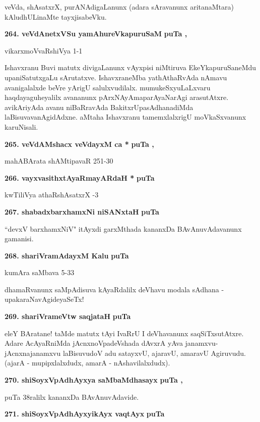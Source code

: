 \smallskip
veVda, shAsatxrX, purANAdigaLanunx (adara sAravanunx aritanaMtara) kAludhULi\-naMte tayxjisabeVku.

\medskip
\noindent
\textbf{264. veVdAnetxVSu yamAhureVkapuruSaM} \hfill{\bf puTa \pageref{232}, \pageref{243}}

\hfill{vikarxmoVvaRshiVya 1-1}

\smallskip
Ishavxranu Buvi matutx divigaLanunx vAyxpisi niMtiruva EkeYkapuruSaneMdu upaniSatutxgaLu sAru\-tatxve. IshavxraneMba yathAthaRvAda nAmavu avanigalalxde beVre yArigU salulxvudilalx. mumukeSx\-yuLaLx\-varu haqdayaguheyalilx avananunx pArxNAyAmaparAyaNarAgi arasutAtxre. avikAriyAda avanu niBaR\-ravAda BakitxrUpasAdhanadiMda laBisuvavanAgidAdxne. aMtaha Ishavxranu tamemxlalxrigU moVkaSxvanunx karuNisali.

\medskip
\noindent
\textbf{265. veVdAMshacx veVdayxM ca *} \hfill{\bf puTa \pageref{133}, \pageref{144}}

\hfill{mahABArata shAMtipavaR 251-30}

\medskip
\noindent
\textbf{266. vayxvasithxtAyaRmayARdaH *} \hfill{\bf puTa \pageref{90}}

\hfill{kwTiliVya athaRshAsatxrX -3}

\medskip
\noindent
\textbf{267. shabadxbarxhamxNi niSANxtaH} \hfill{\bf puTa \pageref{160}}

\smallskip
``devxV barxhamxNiV" itAyxdi garxMthada kananxDa BAvAnuvAdavanunx gamanisi.

\medskip
\noindent
\textbf{268. shariVramAdayxM Kalu} \hfill{\bf puTa \pageref{77}}

\hfill{kumAra saMbava 5-33}

\smallskip
dhamaRvanunx saMpAdisuva kAyaRdalilx deVhavu modala sAdhana - upakaraNavAgideyaSeTx!

\medskip
\noindent
\textbf{269. shariVrameVtw saqjataH} \hfill{\bf puTa \pageref{91}}

\smallskip
eleY BAratane! taMde matutx tAyi IvaRrU I deVhavanunx saqSiTxsutAtxre. Adare AcAyaRniMda jAcnxnoVpadeVshada dAvxrA yAva janamxvu-jAcnxnajanamxvu laBisuvudoV adu satayxvU, ajaravU, amaravU Agiruvudu. (ajarA - mupipxlalxdudx, amarA - nAshavilalxdudx).


\medskip
\noindent
\textbf{270. shiSoyxVpAdhAyxya saMbaMdhasayx} \hfill{\bf puTa \pageref{38}, \pageref{83}}

\smallskip
puTa 38ralilx kananxDa BAvAnuvAdavide.

\eject

\noindent
\textbf{271. shiSoyxVpAdhAyxyikAyx vaqtAyx} \hfill{\bf puTa \pageref{105}}

